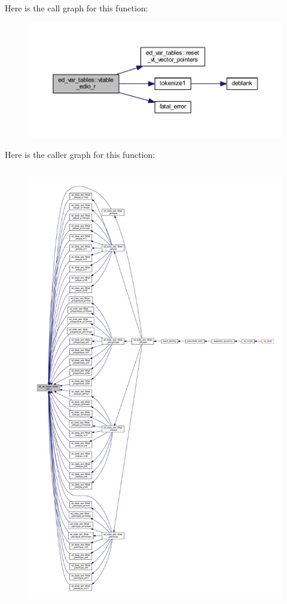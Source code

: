 Here is the call graph for this function\+:\nopagebreak
\begin{figure}[H]
\begin{center}
\leavevmode
\includegraphics[width=350pt]{namespaceed__var__tables_a36d6819fcfd324eb837656868073559d_cgraph}
\end{center}
\end{figure}




Here is the caller graph for this function\+:\nopagebreak
\begin{figure}[H]
\begin{center}
\leavevmode
\includegraphics[height=550pt]{namespaceed__var__tables_a36d6819fcfd324eb837656868073559d_icgraph}
\end{center}
\end{figure}


